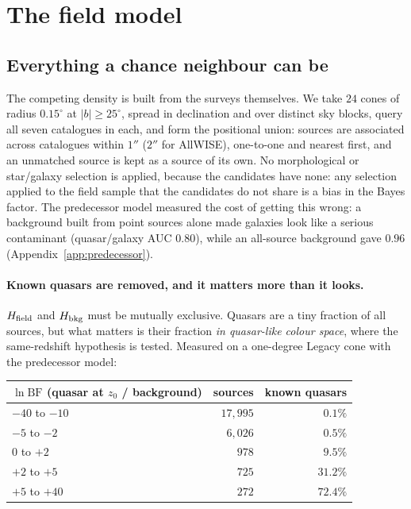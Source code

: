 \documentclass[11pt,a4paper]{article}
\newcommand{\Hfield}{H_{\rm field}}
\newcommand{\Hbkg}{H_{\rm bkg}}
\begin{document}
\section{The field model}
\label{sec:background}

\subsection{Everything a chance neighbour can be}

The competing density is built from the surveys themselves. We take $24$ cones
of radius $0.15^\circ$ at $|b|\ge25^\circ$, spread in declination and over
distinct sky blocks, query all seven catalogues in each, and form the positional
union: sources are associated across catalogues within $1''$ ($2''$ for
AllWISE), one-to-one and nearest first, and an unmatched source is kept as a
source of its own. No morphological or star/galaxy selection is applied, because
the candidates have none: any selection applied to the field sample that the
candidates do not share is a bias in the Bayes factor. The predecessor model
measured the cost of getting this wrong: a background built from point sources
alone made galaxies look like a serious contaminant (quasar/galaxy AUC $0.80$),
while an all-source background gave $0.96$ (Appendix~\ref{app:predecessor}).

\paragraph{Known quasars are removed, and it matters more than it looks.}
$\Hfield$ and $\Hbkg$ must be mutually exclusive. Quasars are a tiny fraction of
all sources, but what matters is their fraction \emph{in quasar-like colour
space}, where the same-redshift hypothesis is tested. Measured on a one-degree
Legacy cone with the predecessor model:

\begin{center}
\begin{tabular}{lrr}
\toprule
$\ln \mathrm{BF}$ (quasar at $z_0$ / background) & sources &
known quasars \\
\midrule
$-40$ to $-10$ & $17{,}995$ & $0.1\%$ \\
$-5$ to $-2$   & $6{,}026$  & $0.5\%$ \\
$0$ to $+2$    & $978$      & $9.5\%$ \\
$+2$ to $+5$   & $725$      & $31.2\%$ \\
$+5$ to $+40$  & $272$      & $\mathbf{72.4\%}$ \\
\bottomrule
\end{tabular}
\end{center}
\end{document}
